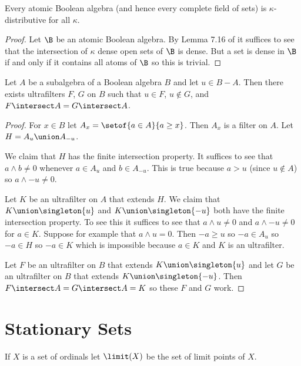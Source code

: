 \documentclass[oneside,12pt]{amsart}
\begin{document}
\begin{lemma}
Every atomic Boolean algebra (and hence every complete field of sets) is
$\kappa$-distributive for all $\kappa$.
\end{lemma}
\begin{proof}
Let $\B$ be an atomic Boolean algebra. By Lemma 7.16 of \cite{Jech_Book2} it suffices to
see that the intersection of $\kappa$ dense open sets of $\B$ is dense. But a set is dense
in $\B$ if and
only if it contains all atoms of $\B$ so this is trivial.
\end{proof}

\begin{lemma} Let $A$ be a subalgebra of a Boolean algebra $B$
and let $u\in B - A$. Then there exists ultrafilters $F$, $G$ on $B$ such that $u\in F$, $u\notin G$,
and $F\intersect A = G\intersect A$.
\end{lemma}
\begin{proof}
For $x\in B$ let $A_x=\setof{a\in A}{a \geq x}$. Then $A_x$ is a filter on $A$.
Let $H = A_u \union A_{-u}$.

We claim that $H$ has the finite intersection property.
It suffices to see that $a\wedge b\not= 0$ whenever $a\in A_u$ and $b\in A_{-u}$.
This is true because $a > u$ (since $u\not\in A$) so $a\wedge -u \not = 0$.

Let $K$ be an ultrafilter on $A$ that extends $H$. We claim that $K\union\singleton{u}$
and $K\union\singleton{-u}$ both have the finite intersection property. To see this
it suffices to see that $a\wedge u \not=0$ and $a\wedge -u \not=0$ for $a\in K$. Suppose
for example that $a\wedge u = 0$. Then $-a \geq u$ so $-a \in A_u$ so $-a \in H$ so $-a \in K$
which is impossible because $a\in K$ and $K$ is an ultrafilter.

Let $F$ be an ultrafilter on $B$ that extends $K\union\singleton{u}$ and let $G$ be an ultrafilter
on $B$ that extends  $K\union\singleton{-u}$. Then $F\intersect A = G\intersect A = K$ so these $F$ and $G$ work.
\end{proof}

\section{Stationary Sets}

\begin{definition}
If $X$ is a set of ordinals let $\limit(X)$ be the set of limit points of $X$.
\end{definition}
\end{document}
